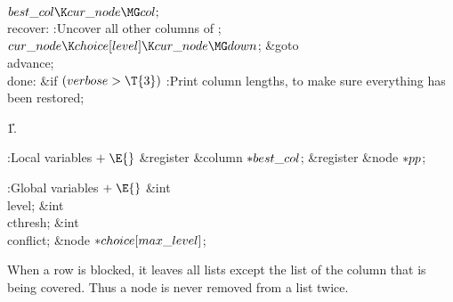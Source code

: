 ${}\\{best\_col}\K\\{cur\_node}\MG\\{col};{}$\6
\4\\{recover}:\5
:Uncover all other columns of \X;\6
${}\\{cur\_node}\K\\{choice}[\\{level}]\K\\{cur\_node}\MG\\{down}{}$;\5
\&{goto} \\{advance};\6
\4\\{done}:\6
\&{if} ${}(\\{verbose}>\T{3}){}$\1\5
:Print column lengths, to make sure everything has been restored\X;\2\par
\U1.\fi

\B{}:Local variables\X${}\mathrel+\E{}$\6
\&{register} \&{column} ${}{*}\\{best\_col}{}$;\6
\&{register} \&{node} ${}{*}\\{pp}{}$;\par
\fi

\B{}:Global variables\X${}\mathrel+\E{}$\6
\&{int} \\{level};\6
\&{int} \\{cthresh};\6
\&{int} \\{conflict};\6
\&{node} ${}{*}\\{choice}[\\{max\_level}]{}$;\par
\fi

When a row is blocked, it leaves all lists except the list of the
column that is being covered. Thus a node is never removed from a list
twice.

